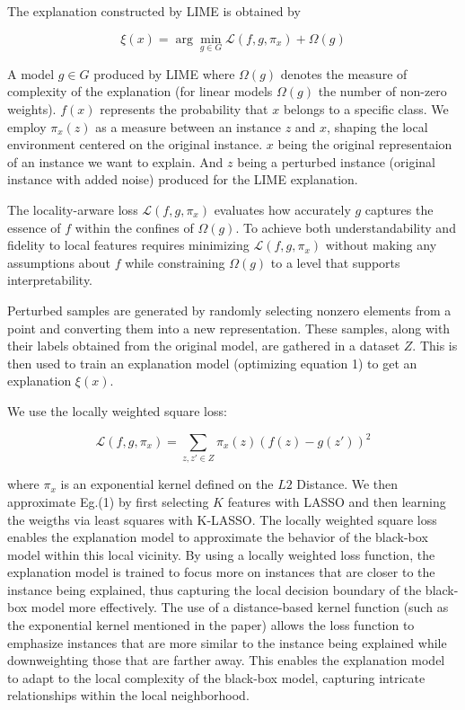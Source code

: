 \documentclass{article}
\begin{document}
The explanation constructed by LIME is obtained by

\begin{equation}
\xi(x) = \arg \min_{g \in G}  \mathcal{L}(f, g, \pi_x) + \Omega(g)    
\end{equation}

A model $g \in G$ produced by LIME where $\Omega(g)$ denotes the measure of complexity of the explanation (for linear models $\Omega(g)$ the number of non-zero weights). 
$f(x)$ represents the probability that $x$ belongs to a specific class.
We employ $\pi_x(z)$ as a measure between an instance $z$ and $x$, shaping the local environment centered on the original instance. 
$x$ being the original representaion of an instance we want to explain. And $z$ being a perturbed instance (original instance with added noise) produced for the LIME explanation. 

The locality-arware loss $\mathcal{L}(f, g, \pi_x)$ evaluates how accurately $g$ captures the essence of $f$ within the confines of $\Omega(g)$. 
To achieve both understandability and fidelity to local features requires minimizing $\mathcal{L}(f, g, \pi_x)$ without making any assumptions about $f$ while constraining $\Omega(g)$ to a level that supports interpretability. 

Perturbed samples are generated by randomly selecting nonzero elements from a point and converting them into a new representation. These samples, along with their labels obtained from the original model, are gathered in a dataset $Z$. This is then used to train an explanation model (optimizing equation 1) to get an explanation $\xi(x)$. 

We use the locally weighted square loss:

\begin{equation}
\mathcal{L}(f, g, \pi_x) = \sum_{z, z' \in Z } \pi_x(z)(f(z)-g(z'))^2
\end{equation}

where $\pi_x$ is an exponential kernel defined on the $L2$ Distance. We then approximate Eg.(1) by first selecting $K$ features with LASSO and then learning the weigths via least squares with K-LASSO.
The locally weighted square loss enables the explanation model to approximate the behavior of the black-box model within this local vicinity.
By using a locally weighted loss function, the explanation model is trained to focus more on instances that are closer to the instance being explained, thus capturing the local decision boundary of the black-box model more effectively.
The use of a distance-based kernel function (such as the exponential kernel mentioned in the paper) allows the loss function to emphasize instances that are more similar to the instance being explained while downweighting those that are farther away. This enables the explanation model to adapt to the local complexity of the black-box model, capturing intricate relationships within the local neighborhood. 
\end{document}
